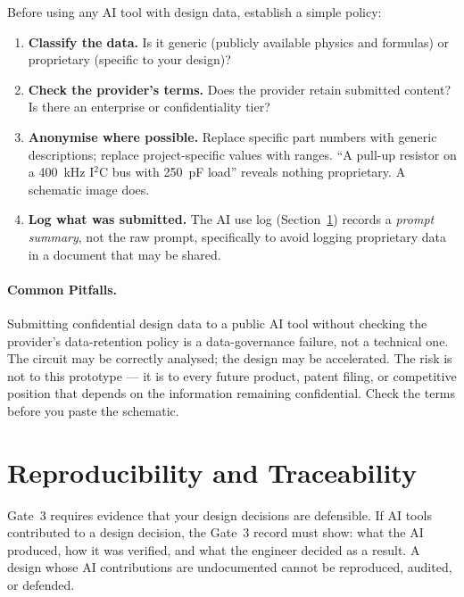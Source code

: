 Before using any AI tool with design data, establish a simple policy:
\begin{enumerate}
  \item \textbf{Classify the data.} Is it generic (publicly available physics
        and formulas) or proprietary (specific to your design)?
  \item \textbf{Check the provider's terms.} Does the provider retain submitted
        content? Is there an enterprise or confidentiality tier?
  \item \textbf{Anonymise where possible.} Replace specific part numbers with
        generic descriptions; replace project-specific values with ranges.
        ``A pull-up resistor on a 400~kHz I$^2$C bus with 250~pF load'' reveals
        nothing proprietary. A schematic image does.
  \item \textbf{Log what was submitted.} The AI use log
        (Section~\ref{sec:ch8-traceability}) records a \emph{prompt summary},
        not the raw prompt, specifically to avoid logging proprietary data in a
        document that may be shared.
\end{enumerate}

\paragraph{Common Pitfalls.}
Submitting confidential design data to a public AI tool without checking the
provider's data-retention policy is a data-governance failure, not a technical
one.
The circuit may be correctly analysed; the design may be accelerated.
The risk is not to this prototype --- it is to every future product, patent
filing, or competitive position that depends on the information remaining
confidential.
Check the terms before you paste the schematic.

\section{Reproducibility and Traceability}
\label{sec:ch8-traceability}

Gate~3 requires evidence that your design decisions are defensible.
If AI tools contributed to a design decision, the Gate~3 record must show:
what the AI produced, how it was verified, and what the engineer decided as a
result.
A design whose AI contributions are undocumented cannot be reproduced,
audited, or defended.

